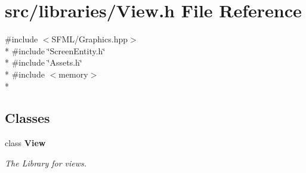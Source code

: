 \section{src/libraries/\-View.h File Reference}
\label{_view_8h}
{\ttfamily \#include $<$S\-F\-M\-L/\-Graphics.\-hpp$>$}\\*
{\ttfamily \#include \char`\"{}Screen\-Entity.\-h\char`\"{}}\\*
{\ttfamily \#include \char`\"{}Assets.\-h\char`\"{}}\\*
{\ttfamily \#include $<$memory$>$}\\*
\subsection*{Classes}
\begin{DoxyCompactItemize}
\item 
class {\bf View}
\begin{DoxyCompactList}\small\item\em The Library for views. \end{DoxyCompactList}\end{DoxyCompactItemize}
